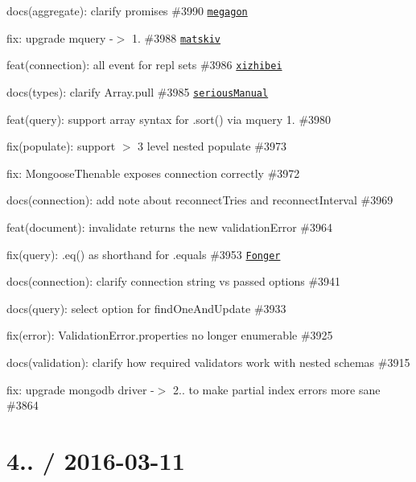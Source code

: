 \begin{DoxyItemize}
\item docs(aggregate)\+: clarify promises \#3990 \href{https://github.com/megagon}{\tt megagon}
\item fix\+: upgrade mquery -\/$>$ 1. \#3988 \href{https://github.com/matskiv}{\tt matskiv}
\item feat(connection)\+: \textquotesingle{}all\textquotesingle{} event for repl sets \#3986 \href{https://github.com/xizhibei}{\tt xizhibei}
\item docs(types)\+: clarify Array.\+pull \#3985 \href{https://github.com/seriousManual}{\tt serious\+Manual}
\item feat(query)\+: support array syntax for .sort() via mquery 1. \#3980
\item fix(populate)\+: support $>$ 3 level nested populate \#3973
\item fix\+: Mongoose\+Thenable exposes connection correctly \#3972
\item docs(connection)\+: add note about reconnect\+Tries and reconnect\+Interval \#3969
\item feat(document)\+: invalidate returns the new validation\+Error \#3964
\item fix(query)\+: .eq() as shorthand for .equals \#3953 \href{https://github.com/Fonger}{\tt Fonger}
\item docs(connection)\+: clarify connection string vs passed options \#3941
\item docs(query)\+: select option for find\+One\+And\+Update \#3933
\item fix(error)\+: Validation\+Error.\+properties no longer enumerable \#3925
\item docs(validation)\+: clarify how required validators work with nested schemas \#3915
\item fix\+: upgrade mongodb driver -\/$>$ 2.. to make partial index errors more sane \#3864
\end{DoxyItemize}

\section*{4.. / 2016-\/03-\/11 }


